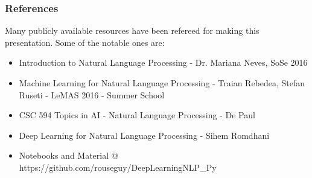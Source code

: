 \begin{frame}\frametitle{References}
Many publicly available resources have been refereed for making this presentation. Some of the notable ones are:
\begin{itemize}
\item Introduction to Natural Language Processing - Dr. Mariana Neves, SoSe 2016
\item Machine Learning for Natural Language Processing - Traian Rebedea, Stefan Ruseti - LeMAS 2016 - Summer School
\item CSC 594 Topics in AI - Natural Language Processing - De Paul
\item Deep Learning for Natural Language Processing - Sihem Romdhani
\item Notebooks and Material @ https://github.com/rouseguy/DeepLearningNLP\_Py
\end{itemize}
\end{frame}
